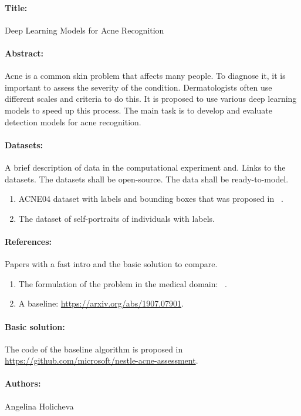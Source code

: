\documentclass[12pt]{article}
\begin{document}
\paragraph{Title:} Deep Learning Models for Acne Recognition

\paragraph{Abstract:} Acne is a common skin problem that affects many people. To diagnose it, it is important to assess the severity of the condition. Dermatologists often use different scales and criteria to do this. It is proposed to use various deep learning models to speed up this process. The main task is to develop and evaluate detection models for acne recognition.

\paragraph{Datasets:}  A brief description of data in the computational experiment and. Links to the datasets. The datasets shall be open-source. The data shall be ready-to-model.
\begin{enumerate}
\item ACNE04 dataset with labels and bounding boxes that was proposed in ~\cite{wu2019joint}.
\item The dataset of self-portraits of individuals with labels.
\end{enumerate}

\paragraph{References:}  Papers with a fast intro and the basic solution to compare.
\begin{enumerate}
\item The formulation of the problem in the medical domain: ~\cite{https://doi.org/10.1046/j.1365-4362.1997.00099.x}.
\item A baseline: \url{https://arxiv.org/abs/1907.07901}.
\end{enumerate}

\paragraph{Basic solution:} The code of the baseline algorithm is proposed in \url{https://github.com/microsoft/nestle-acne-assessment}.

\paragraph{Authors:} Angelina Holicheva



\end{document}
